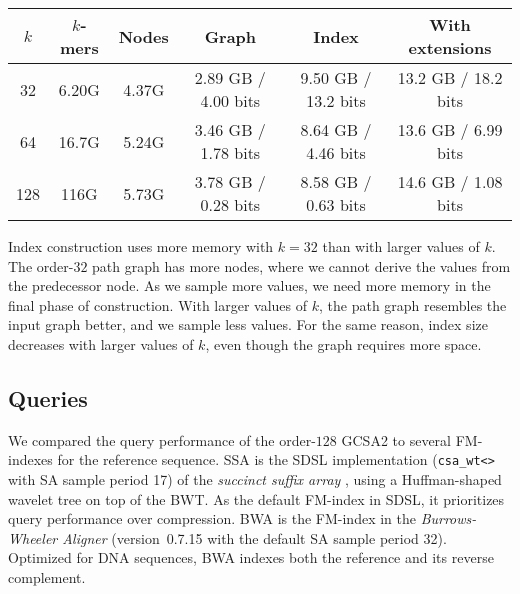\documentclass[twoside,leqno,twocolumn]{article}
\newcommand{\kmer}[1]{$#1$\nobreakdash-mer}
\newcommand{\orderk}[1]{order\nobreakdash-$#1$}
\newcommand{\bvOUT}{\ensuremath{\mathsf{OUT}}}
\begin{document}
\begin{table*}[t]
\begin{center}
\begin{tabular}{c|cc|c|c|c}
\hline
$k$ & \textbf{\kmer{k}s} & \textbf{Nodes} & \textbf{Graph} & \textbf{Index} & \textbf{With extensions} \\
\hline
 32 & 6.20G & 4.37G & 2.89 GB / 4.00 bits & 9.50 GB / 13.2 bits & 13.2 GB / 18.2 bits \\
 64 & 16.7G & 5.24G & 3.46 GB / 1.78 bits & 8.64 GB / 4.46 bits & 13.6 GB / 6.99 bits \\
128 &  116G & 5.73G & 3.78 GB / 0.28 bits & 8.58 GB / 0.63 bits & 14.6 GB / 1.08 bits \\
\hline
\end{tabular}
\caption{GCSA2 index sizes. Order of the path graph; number of \kmer{k}s and nodes in the path graph in billions; index size in gigabytes and in bits per \kmer{k} for the graph ($B_{c}$ and $\bvOUT$), the index (the graph, $B_{S}$, $B_{V}$, and $V_{S}$), and the index with the extensions from Appendix~\ref{appendix:extensions}.}\label{table:indexes}
\end{center}
\end{table*}

Index construction uses more memory with $k = 32$ than with larger values of $k$. The \orderk{32} path graph has more nodes, where we cannot derive the values from the predecessor node. As we sample more values, we need more memory in the final phase of construction. With larger values of $k$, the path graph resembles the input graph better, and we sample less values. For the same reason, index size decreases with larger values of $k$, even though the graph requires more space.

\subsection{Queries}

We compared the query performance of the \orderk{128} GCSA2 to several FM-indexes for the reference sequence. SSA is the SDSL implementation (\texttt{csa\_wt<>} with SA sample period 17) of the \emph{succinct suffix array} \cite{Maekinen2005}, using a Huffman-shaped wavelet tree on top of the BWT. As the default FM-index in SDSL, it prioritizes query performance over compression. BWA is the FM-index in the \emph{Burrows-Wheeler Aligner} \cite{Li2009} (version~0.7.15 with the default SA sample period 32). Optimized for DNA sequences, BWA indexes both the reference and its reverse complement.
\end{document}
